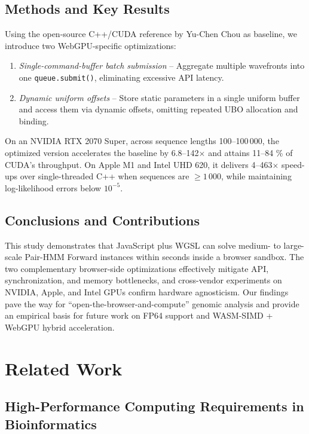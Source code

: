 \documentclass[PhD]{PHlab-thesis}
\begin{document}
\section{Methods and Key Results}
Using the open-source C++/CUDA reference by Yu-Chen Chou \cite{chou2024} as baseline, we introduce two WebGPU-specific optimizations:

\begin{enumerate}
  \item \textit{Single-command-buffer batch submission} – Aggregate multiple wavefronts into one \verb|queue.submit()|, eliminating excessive API latency.
  \item \textit{Dynamic uniform offsets} – Store static parameters in a single uniform buffer and access them via dynamic offsets, omitting repeated UBO allocation and binding.
\end{enumerate}

On an NVIDIA RTX 2070 Super, across sequence lengths 100–100\,000, the optimized version accelerates the baseline by 6.8–142$\times$ and attains 11–84 \% of CUDA's throughput. On Apple M1 and Intel UHD 620, it delivers 4–463$\times$ speed-ups over single-threaded C++ when sequences are $\ge 1\,000$, while maintaining log-likelihood errors below $10^{-5}$.

\section{Conclusions and Contributions}
This study demonstrates that JavaScript plus WGSL can solve medium- to large-scale Pair-HMM Forward instances within seconds inside a browser sandbox. The two complementary browser-side optimizations effectively mitigate API, synchronization, and memory bottlenecks, and cross-vendor experiments on NVIDIA, Apple, and Intel GPUs confirm hardware agnosticism.  
Our findings pave the way for “open-the-browser-and-compute” genomic analysis and provide an empirical basis for future work on FP64 support and WASM-SIMD + WebGPU hybrid acceleration.




\chapter{Related Work}

\section{High-Performance Computing Requirements in Bioinformatics}
\end{document}
